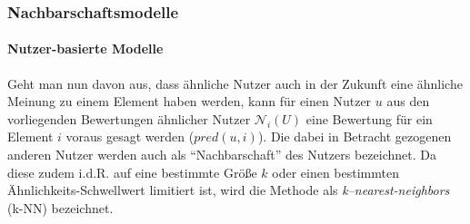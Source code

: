 \subsubsection{Nachbarschaftsmodelle}\label{sec:neighborhoods}

\paragraph{Nutzer-basierte Modelle} Geht man nun davon aus, dass ähnliche Nutzer auch in der Zukunft eine ähnliche Meinung zu einem Element haben werden, kann für einen Nutzer $u$ aus den vorliegenden Bewertungen ähnlicher Nutzer $\mathcal{N}_i(U)$ eine Bewertung für ein Element $i$ voraus gesagt werden ($pred(u,i)$). Die dabei in Betracht gezogenen anderen Nutzer werden auch als ``Nachbarschaft'' des Nutzers bezeichnet. Da diese zudem i.d.R. auf eine bestimmte Größe $k$ oder einen bestimmten Ähnlichkeits-Schwellwert limitiert ist, wird die Methode als \textit{k--nearest-neighbors} (k-NN) bezeichnet.

